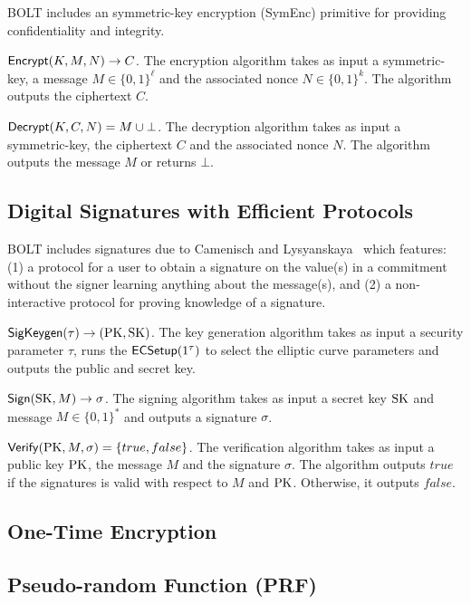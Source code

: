\documentclass[10pt]{report}
\begin{document}
BOLT includes an symmetric-key encryption (SymEnc) primitive for providing confidentiality and integrity. 

\medskip \noindent
${\sf Encrypt}(K, M, N) \rightarrow C$. The encryption algorithm takes as input a symmetric-key, a message $M \in \{0,1\}^\ell$ and the associated nonce $N \in \{0,1\}^k$. The algorithm outputs the ciphertext $C$. 

\medskip \noindent
${\sf Decrypt}(K, C, N) = M \cup \bot$. The decryption algorithm takes as input a symmetric-key, the ciphertext $C$ and the associated nonce $N$. The algorithm outputs the message $M$ or returns $\bot$.


\subsection{Digital Signatures with Efficient Protocols} %
\label{sec:signatures}

BOLT includes signatures due to Camenisch and Lysyanskaya~\cite{TODO} which features: (1) a protocol for a user to obtain a signature on the value(s) in a commitment without the signer learning anything about the message(s), and (2) a non-interactive protocol for proving knowledge of a signature.

\medskip \noindent
${\sf SigKeygen}(\tau) \rightarrow (\mathrm{PK}, \mathrm{SK})$. The key generation algorithm takes as input a security parameter $\tau$, runs the ${\sf ECSetup}(1^\tau)$ to select the elliptic curve parameters and outputs the public and secret key.

\medskip \noindent
${\sf Sign}(\mathrm{SK}, M) \rightarrow \sigma$. The signing algorithm takes as input a secret key $\mathrm{SK}$ and message $M \in \{0,1\}^*$ and outputs a signature $\sigma$.

\medskip \noindent
${\sf Verify}(\mathrm{PK}, M, \sigma) =  \{true, false\}$. The verification algorithm takes as input a public key $\mathrm{PK}$, the message $M$ and the signature $\sigma$. The algorithm outputs $true$ if the signatures is valid with respect to $M$ and $\mathrm{PK}$. Otherwise, it outputs $false$.


\subsection{One-Time Encryption} 
\label{sec:ote}


\subsection{Pseudo-random Function (PRF)}
\label{sec:prf}
\end{document}
